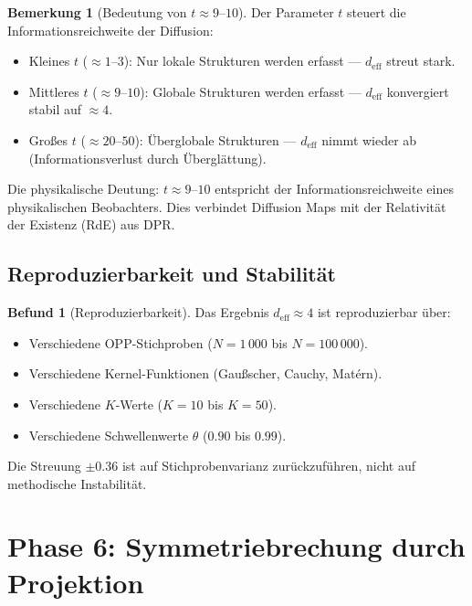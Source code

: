 \documentclass[11pt,a4paper]{article}
\theoremstyle{plain}
\theoremstyle{definition}
\newtheorem{remark}{Bemerkung}[section]
\newtheorem{befund}{Befund}[section]
\newcommand{\deff}{d_{\mathrm{eff}}}
\begin{document}
\begin{remark}[Bedeutung von $t \approx 9$--$10$]
Der Parameter $t$ steuert die Informationsreichweite der Diffusion:
\begin{itemize}
  \item Kleines $t$ ($\approx 1$--$3$): Nur lokale Strukturen werden
        erfasst --- $\deff$ streut stark.
  \item Mittleres $t$ ($\approx 9$--$10$): Globale Strukturen werden
        erfasst --- $\deff$ konvergiert stabil auf $\approx 4$.
  \item Gro\ss{}es $t$ ($\approx 20$--$50$): \"{U}berglobale Strukturen ---
        $\deff$ nimmt wieder ab (Informationsverlust durch
        \"{U}bergl\"{a}ttung).
\end{itemize}
Die physikalische Deutung: $t \approx 9$--$10$ entspricht der
Informationsreichweite eines physikalischen Beobachters. Dies verbindet
Diffusion Maps mit der Relativit\"{a}t der Existenz (RdE) aus DPR.
\end{remark}

\subsection{Reproduzierbarkeit und Stabilit\"{a}t}

\begin{befund}[Reproduzierbarkeit]
Das Ergebnis $\deff \approx 4$ ist reproduzierbar \"{u}ber:
\begin{itemize}
  \item Verschiedene OPP-Stichproben ($N = 1\,000$ bis $N = 100\,000$).
  \item Verschiedene Kernel-Funktionen (Gau\ss{}scher, Cauchy, Matérn).
  \item Verschiedene $K$-Werte ($K = 10$ bis $K = 50$).
  \item Verschiedene Schwellenwerte $\theta$ ($0.90$ bis $0.99$).
\end{itemize}
Die Streuung $\pm 0.36$ ist auf Stichprobenvarianz zur\"{u}ckzuf\"{u}hren,
nicht auf methodische Instabilit\"{a}t.
\end{befund}

\section{Phase 6: Symmetriebrechung durch Projektion}
\end{document}
